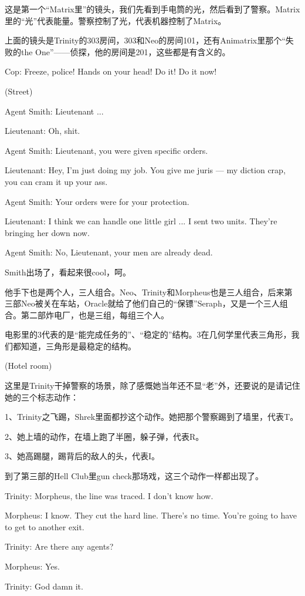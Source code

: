 \documentclass{ctexart}
\newenvironment{myquote}{\color{green} \setlength{\leftskip}{6em} \setlength{\rightskip}{4em} \setlength{\parindent}{-2em}}{\par}
\begin{document}
这是第一个“Matrix里”的镜头，我们先看到手电筒的光，然后看到了警察。Matrix里的“光”代表能量。警察控制了光，代表机器控制了Matrix。

上面的镜头是Trinity的303房间，303和Neo的房间101，还有Animatrix里那个“失败的the One”——侦探，他的房间是201，这些都是有含义的。

\begin{myquote}
Cop: Freeze, police! Hands on your head! Do it! Do it now!

(Street)

Agent Smith: Lieutenant ...

Lieutenant: Oh, shit.

Agent Smith: Lieutenant, you were given specific orders.

Lieutenant: Hey, I'm just doing my job. You give me juris --- my diction crap, you can cram it up your ass.

Agent Smith: Your orders were for your protection.

Lieutenant: I think we can handle one little girl ... I sent two units. They're bringing her down now.

Agent Smith: No, Lieutenant, your men are already dead.
\end{myquote}

Smith出场了，看起来很cool，呵。

他手下也是两个人，三人组合。Neo、Trinity和Morpheus也是三人组合，后来第三部Neo被关在车站，Oracle就给了他们自己的“保镖”Seraph，又是一个三人组合。第二部炸电厂，也是三组，每组三个人。

电影里的3代表的是“能完成任务的”、“稳定的”结构。3在几何学里代表三角形，我们都知道，三角形是最稳定的结构。

\begin{myquote}
(Hotel room)
\end{myquote}

这里是Trinity干掉警察的场景，除了感慨她当年还不显“老”外，还要说的是请记住她的三个标志动作：

1、Trinity之飞踢，Shrek里面都抄这个动作。她把那个警察踢到了墙里，代表T。

2、她上墙的动作，在墙上跑了半圈，躲子弹，代表R。

3、她高踢腿，踢背后的敌人的头，代表I。

到了第三部的Hell Club里gun check那场戏，这三个动作一样都出现了。

\begin{myquote}
Trinity: Morpheus, the line was traced. I don't know how.

Morpheus: I know. They cut the hard line. There's no time. You're going to have to get to another exit.

Trinity: Are there any agents?

Morpheus: Yes.

Trinity: God damn it.
\end{myquote}
\end{document}
